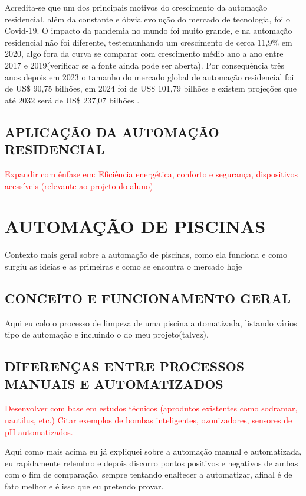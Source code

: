         Acredita-se que um dos principais motivos do crescimento da automação residencial, além da constante e óbvia evolução do mercado de tecnologia, foi o Covid-19. O impacto da pandemia no mundo foi muito grande, e na automação residencial não foi diferente, testemunhando um crescimento de cerca 11,9\% em 2020, algo fora da curva se comparar com crescimento médio ano a ano entre 2017 e 2019\cite{automacaoCovid}(verificar se a fonte ainda pode ser aberta). Por consequência três anos depois em 2023 o tamanho do mercado global de automação residencial foi de US\$ 90,75 bilhões, em 2024 foi de US\$ 101,79 bilhões e existem projeções que até 2032 será de US\$ 237,07 bilhões \cite{automacaoDepoisCovid}.
        
    
    \subsection{APLICAÇÃO DA AUTOMAÇÃO RESIDENCIAL}
        \textcolor{red}{Expandir com ênfase em: Eficiência energética, conforto e segurança, dispositivos acessíveis (relevante ao projeto do aluno)}
    
        
\section{AUTOMAÇÃO DE PISCINAS}

    Contexto mais geral sobre a automação de piscinas, como ela funciona e como surgiu as ideias e as primeiras e como se encontra o mercado hoje

    \subsection{CONCEITO E FUNCIONAMENTO GERAL}
        Aqui eu colo o processo de limpeza de uma piscina automatizada, listando vários tipo de automação e incluindo o do meu projeto(talvez).

    \subsection{DIFERENÇAS ENTRE PROCESSOS MANUAIS E AUTOMATIZADOS}

        \textcolor{red}{Desenvolver com base em estudos técnicos (aprodutos existentes como sodramar, nautilus, etc.) Citar exemplos de bombas inteligentes, ozonizadores, sensores de pH automatizados.}
    
        Aqui como mais acima eu já expliquei sobre a automação manual e automatizada, eu rapidamente relembro e depois discorro pontos positivos e negativos de ambas com o fim de comparação, sempre tentando enaltecer a automatizar, afinal é de fato melhor e é isso que eu pretendo provar.
    
